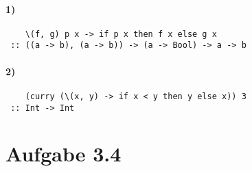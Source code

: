 \documentclass[a4paper]{scrartcl}
\begin{document}
\paragraph{1)}
\begin{verbatim}
    \(f, g) p x -> if p x then f x else g x
 :: ((a -> b), (a -> b)) -> (a -> Bool) -> a -> b
\end{verbatim}

\paragraph{2)}
\begin{verbatim}
    (curry (\(x, y) -> if x < y then y else x)) 3
 :: Int -> Int
\end{verbatim}


\section{Aufgabe 3.4}
\inputminted{haskell}{update.hs}
\end{document}
